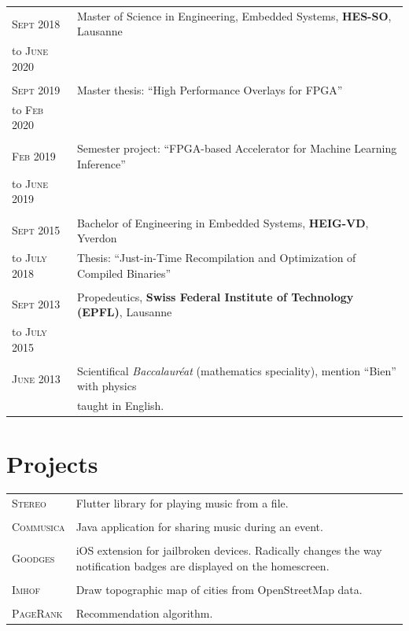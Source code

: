 \documentclass[a4paper,10pt]{article}
\begin{document}
\begin{tabular}{lp{12cm}}
    \textsc{Sept 2018} & Master of Science in Engineering, Embedded Systems, \textbf{HES-SO}, Lausanne \\
    to \textsc{June 2020} \\
    \\
    \textsc{Sept 2019} & Master thesis: ``High Performance Overlays for FPGA'' \\
    to \textsc{Feb 2020} \\
    \\
    \textsc{Feb 2019} & Semester project: ``FPGA-based Accelerator for Machine Learning Inference'' \\
    to \textsc{June 2019} \\
    \\
    \textsc{Sept 2015} & Bachelor of Engineering in Embedded Systems, \textbf{HEIG-VD}, Yverdon \\
    to \textsc{July 2018} & Thesis: ``Just-in-Time Recompilation and Optimization of Compiled Binaries'' \\
    \\
    \textsc{Sept 2013} & Propedeutics, \textbf{Swiss Federal Institute of Technology (EPFL)}, Lausanne \\
    to \textsc{July 2015} \\
    \\
    \textsc{June 2013} & Scientifical \textit{Baccalauréat} (mathematics speciality), mention ``Bien'' with physics \\
    \hspace*{2.3cm} & taught in English.
\end{tabular}

\section{Projects}

\begin{tabular}{p{2.3cm}p{12cm}}
    \textsc{Stereo}
    & Flutter library for playing music from a file. \\
    \\

    \textsc{Commusica}
    & Java application for sharing music during an event. \\
    \\

    \textsc{Goodges}
    & iOS extension for jailbroken devices. Radically changes the way notification badges are displayed on the homescreen. \\
    \\

    \textsc{Imhof}
    & Draw topographic map of cities from OpenStreetMap data. \\
    \\

    \textsc{PageRank}
    & Recommendation algorithm.
\end{tabular}
\end{document}
